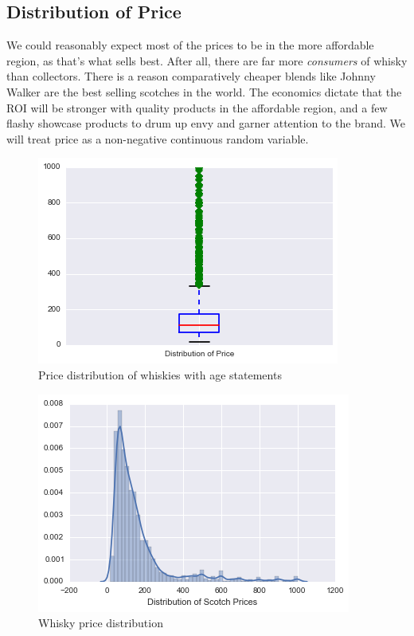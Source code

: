 \subsection{Distribution of Price}

We could reasonably expect most of the prices to be in the more affordable region, as that's what sells best. After all, there are far more \textit{consumers} of whisky than collectors. There is a reason comparatively cheaper blends like Johnny Walker are the best selling scotches in the world. The economics dictate that the ROI will be stronger with quality products in the affordable region, and a few flashy showcase products to drum up envy and garner attention to the brand. We will treat price as a non-negative continuous random variable. 

\begin{figure}[htb]
\centering
\includegraphics[scale=1]{boxplot_price} 
\caption{Price distribution of whiskies with age statements}
\label{fig:boxplot_price_distribution} 
\end{figure}

\begin{figure}[htb]
\centering
\includegraphics[scale=1]{price_distribution} 
\caption{Whisky price distribution}
\label{fig:price_distribution} 
\end{figure}

